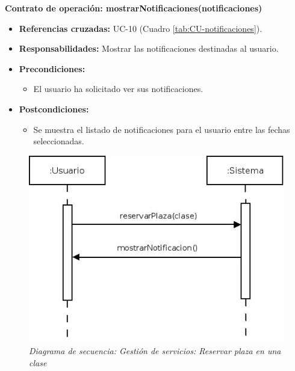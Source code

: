 \textbf{Contrato de operación: mostrarNotificaciones(notificaciones)}
\begin{itemize}
\item \textbf{Referencias cruzadas:} UC-10 (Cuadro \ref{tab:CU-notificaciones}).
\item \textbf{Responsabilidades:} Mostrar las notificaciones destinadas al usuario.
\item \textbf{Precondiciones:} 
 \begin{itemize}
\item El usuario ha solicitado ver sus notificaciones.
\end {itemize}
\item \textbf{Postcondiciones:} 
 \begin{itemize}
\item Se muestra el listado de notificaciones para el usuario entre las fechas seleccionadas.
\end {itemize}
\end {itemize}


\vspace{10mm}

\begin{figure}[H]
\centering
  \includegraphics[scale=.55]{img/secuencias/gestion-servicios-reservar-clase.jpeg}
  \caption{\textit{Diagrama de secuencia: Gestión de servicios: Reservar plaza en una clase}}
  \label{fig:secuencia-gestion-servicios-reservar-clase}
\end{figure}

